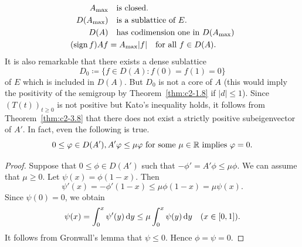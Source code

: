 \begin{align}\label{eq:c2-3.12}
A_{\max} 	& \quad \text{is closed}. \\
D(A_{\max}) & \quad \text{is a sublattice of } E. \\
D(A) & \quad \text{has codimension one in } D(A_{\max}) \\
(\operatorname{sign}  f)Af &= A_{\max}|f| \quad \text{for all } f \in D(A).
\end{align}
It is also remarkable that there exists a dense sublattice 
%
\[
	D_{0} \coloneq \{f \in D(A) \colon f(0) = f(1) = 0\} 
\]
%
of\/ $E$ which is included in $D(A)$.
But $D_{0}$ is not a core of\/ $A$ (this would imply the positivity of the semigroup by Theorem~\ref{thm:c2-1.8}   if\/ $|d| \leq 1$).
Since $(T(t))_{t \geq 0}$ is not positive but Kato's inequality holds, it
follows from Theorem~\ref{thm:c2-3.8}   that there does not exist a strictly positive subeigenvector of\/ $A'$. 
In fact, even the following is true.
\begin{equation} \label{eq:c2-3.16} 
0 \leq \phi \in D(A'),  A'\phi \leq \mu\phi \text{ for some } \mu \in \R \text{ implies } \phi = 0.
\end{equation}
\begin{proof}
Suppose that $0 \leq \phi \in D(A')$ such that $-\phi' = A'\phi \leq \mu\phi$. 
We can assume that $\mu \geq 0$. 
Let $\psi(x) = \phi(1-x)$. 
Then 
\[
\psi'(x) = -\phi'(1-x) \leq \mu\phi(1-x) = \mu\psi(x) .
\]
Since $\psi(0) = 0$, we obtain
\begin{equation*} \label{eq:c2-3-KGK} 
\psi(x) = \int_{0}^{x} \psi'(y) \dy \leq \mu \int_{0}^{x} \psi(y) \dy \quad (x \in [0,1]).
\end{equation*}
It follows from Gronwall's lemma that $\psi \leq 0$. Hence $\phi = \psi = 0$.
\end{proof}
